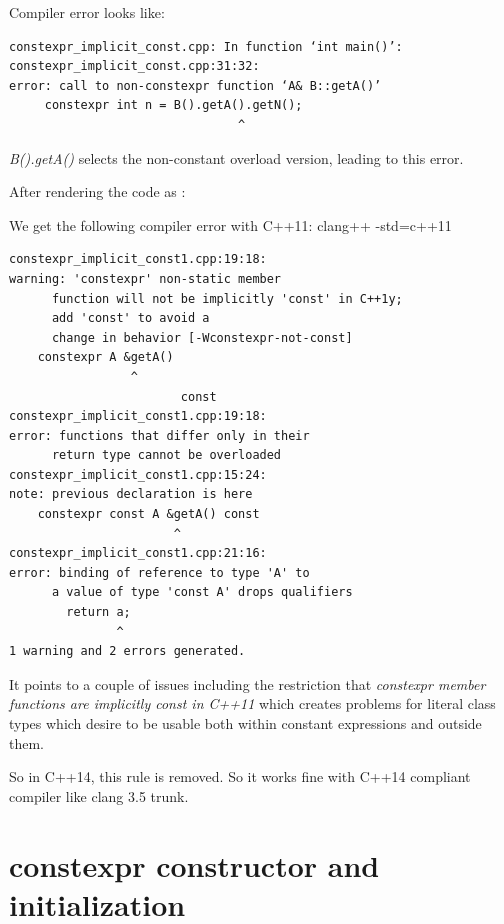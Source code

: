 \begin{Answer}[ref=ex016]
Compiler error looks like:
\begin{verbatim}
constexpr_implicit_const.cpp: In function ‘int main()’:
constexpr_implicit_const.cpp:31:32: 
error: call to non-constexpr function ‘A& B::getA()’
     constexpr int n = B().getA().getN(); 
                                ^
\end{verbatim}

\emph{B().getA()} selects the non-constant overload version, leading to this error. 

After rendering the code as :


We get the following compiler error with C++11: clang++ -std=c++11
\begin{verbatim}
constexpr_implicit_const1.cpp:19:18: 
warning: 'constexpr' non-static member
      function will not be implicitly 'const' in C++1y; 
      add 'const' to avoid a
      change in behavior [-Wconstexpr-not-const]
    constexpr A &getA() 
                 ^
                        const
constexpr_implicit_const1.cpp:19:18: 
error: functions that differ only in their
      return type cannot be overloaded
constexpr_implicit_const1.cpp:15:24: 
note: previous declaration is here
    constexpr const A &getA() const
                       ^
constexpr_implicit_const1.cpp:21:16: 
error: binding of reference to type 'A' to
      a value of type 'const A' drops qualifiers
        return a; 
               ^
1 warning and 2 errors generated.
\end{verbatim}

It points to a couple of issues including the restriction that \emph{constexpr member functions are implicitly const in C++11} which creates problems for literal class types which desire to be usable both within constant expressions and outside them.

So in C++14, this rule is removed. So it works fine with C++14 compliant compiler like clang 3.5 trunk.

\end{Answer}






\section{constexpr constructor and initialization}


